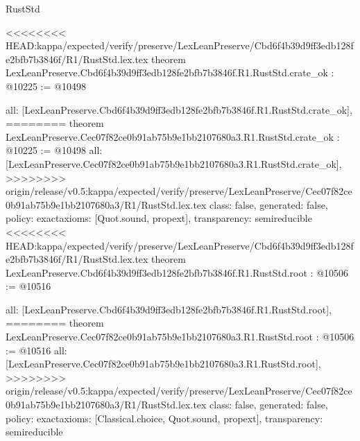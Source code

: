 \begin{lexlean}{RustStd}
\begin{coremodule}
{\begin{coremodule}
{{{{{{{{{{{{{{}
<<<<<<<< HEAD:kappa/expected/verify/preserve/LexLeanPreserve/Cbd6f4b39d9ff3edb128fe2bfb7b3846f/R1/RustStd.lex.tex
theorem LexLeanPreserve.Cbd6f4b39d9ff3edb128fe2bfb7b3846f.R1.RustStd.crate_ok : @10225 := @10498 {
  all: [LexLeanPreserve.Cbd6f4b39d9ff3edb128fe2bfb7b3846f.R1.RustStd.crate_ok],
========
theorem LexLeanPreserve.Cec07f82ce0b91ab75b9e1bb2107680a3.R1.RustStd.crate_ok : @10225 := @10498 {
  all: [LexLeanPreserve.Cec07f82ce0b91ab75b9e1bb2107680a3.R1.RustStd.crate_ok],
>>>>>>>> origin/release/v0.5:kappa/expected/verify/preserve/LexLeanPreserve/Cec07f82ce0b91ab75b9e1bb2107680a3/R1/RustStd.lex.tex
  class: false,
  generated: false,
  policy: exact{axioms: [Quot.sound, propext]},
  transparency: semireducible
}
<<<<<<<< HEAD:kappa/expected/verify/preserve/LexLeanPreserve/Cbd6f4b39d9ff3edb128fe2bfb7b3846f/R1/RustStd.lex.tex
theorem LexLeanPreserve.Cbd6f4b39d9ff3edb128fe2bfb7b3846f.R1.RustStd.root : @10506 := @10516 {
  all: [LexLeanPreserve.Cbd6f4b39d9ff3edb128fe2bfb7b3846f.R1.RustStd.root],
========
theorem LexLeanPreserve.Cec07f82ce0b91ab75b9e1bb2107680a3.R1.RustStd.root : @10506 := @10516 {
  all: [LexLeanPreserve.Cec07f82ce0b91ab75b9e1bb2107680a3.R1.RustStd.root],
>>>>>>>> origin/release/v0.5:kappa/expected/verify/preserve/LexLeanPreserve/Cec07f82ce0b91ab75b9e1bb2107680a3/R1/RustStd.lex.tex
  class: false,
  generated: false,
  policy: exact{axioms: [Classical.choice, Quot.sound, propext]},
  transparency: semireducible
}

}}}}}}}}}}}}}}}
\end{coremodule}}
\end{coremodule}
\end{lexlean}
